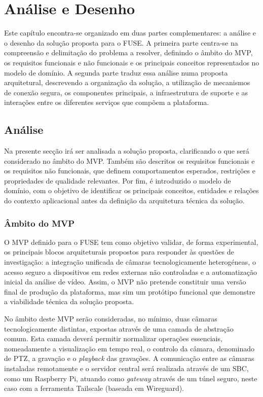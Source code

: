 
\chapter{Análise e Desenho}
\label{chap:analise_e_desenho}

Este capítulo encontra-se organizado em duas partes complementares: a análise e o desenho da solução proposta para o \gls{FUSE}. A primeira parte centra-se na compreensão e delimitação do problema a resolver, definindo o âmbito do \gls{MVP}, os requisitos funcionais e não funcionais e os principais conceitos representados no modelo de domínio. A segunda parte traduz essa análise numa proposta arquitetural, descrevendo a organização da solução, a utilização de mecanismos de conexão segura, os componentes principais, a infraestrutura de suporte e as interações entre os diferentes serviços que compõem a plataforma.

\section{Análise}

Na presente secção irá ser analisada a solução proposta, clarificando o que será considerado no âmbito do \gls{MVP}. Também são descritos os requisitos funcionais e os requisitos não funcionais, que definem comportamentos esperados, restrições e propriedades de qualidade relevantes. Por fim, é introduzido o modelo de domínio, com o objetivo de identificar os principais conceitos, entidades e relações do contexto aplicacional antes da definição da arquitetura técnica da solução.

\subsection{Âmbito do MVP}

O \gls{MVP} definido para o \gls{FUSE} tem como objetivo validar, de forma experimental, os principais blocos arquiteturais propostos para responder às questões de investigação: a integração unificada de câmaras tecnologicamente heterogéneas, o acesso seguro a dispositivos em redes externas não controladas e a automatização inicial da análise de vídeo. Assim, o \gls{MVP} não pretende constituir uma versão final de produção da plataforma, mas sim um protótipo funcional que demonstre a viabilidade técnica da solução proposta.

No âmbito deste \gls{MVP} serão consideradas, no mínimo, duas câmaras tecnologicamente distintas, expostas através de uma camada de abstração comum. Esta camada deverá permitir normalizar operações essenciais, nomeadamente a visualização em tempo real, o controlo da câmara, denominado de \gls{PTZ}, a gravação e o \textit{playback} das gravações. A comunicação entre as câmaras instaladas remotamente e o servidor central será realizada através de um \gls{SBC}, como um Raspberry Pi, atuando como \textit{gateway} através de um túnel seguro, neste caso com a ferramenta Tailscale (baseada em Wireguard).

